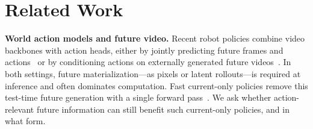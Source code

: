 \documentclass{article}
\begin{document}


\section{Related Work}
\label{sec:related}

\noindent\textbf{World action models and future video.}
Recent robot policies combine video backbones with action heads, either by jointly predicting future frames and actions~\citep{wu2024gr1, cheang2024gr2, hu2025vpp} or by conditioning actions on externally generated future videos~\citep{du2023unipi, black2024susie}. In both settings, future materialization---as pixels or latent rollouts---is required at inference and often dominates computation. Fast current-only policies remove this test-time future generation with a single forward pass~\citep{yuan2026fastwam}. We ask whether action-relevant future information can still benefit such current-only policies, and in what form.
\end{document}

